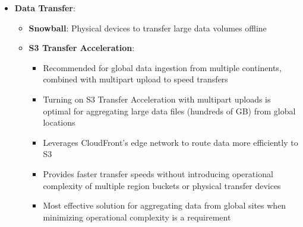\documentclass[11pt,a4paper]{report}
\begin{document}
\begin{itemize}
\begin{itemize}
\begin{itemize}
  \item Perfect for media files that are accessed in unpredictable patterns
  \item Superior to S3 One Zone-IA which doesn't provide multi-AZ resilience required for important media files
\end{itemize}
  \item \textbf{S3 Intelligent-Tiering for Unpredictable Access Patterns}: Automatically moves data between frequent and infrequent access tiers based on observed access patterns without performance impact or operational overhead
  \item \textbf{S3 Intelligent-Tiering with Lifecycle Rules}: When access patterns cannot be predicted or controlled, use S3 Lifecycle rules to transition objects from S3 Standard to S3 Intelligent-Tiering for the most cost-effective storage solution
  \item \textbf{S3 Glacier Instant Retrieval}: For archive data that needs immediate access (retrieval in milliseconds)
  \item \textbf{S3 Glacier Flexible Retrieval}: For rarely accessed long-term data with retrieval times from minutes to hours
  \item \textbf{S3 Glacier Deep Archive}: Lowest-cost storage for long-term archiving with retrieval times within 12 hours
  \item Storage classes have been confirmed to meet diverse performance and cost needs
\end{itemize}
  \item \textbf{Data Transfer}:
\begin{itemize}
  \item \textbf{Snowball}: Physical devices to transfer large data volumes offline
  \item \textbf{S3 Transfer Acceleration}:
\begin{itemize}
  \item Recommended for global data ingestion from multiple continents, combined with multipart upload to speed transfers
  \item Turning on S3 Transfer Acceleration with multipart uploads is optimal for aggregating large data files (hundreds of GB) from global locations
  \item Leverages CloudFront's edge network to route data more efficiently to S3
  \item Provides faster transfer speeds without introducing operational complexity of multiple region buckets or physical transfer devices
  \item Most effective solution for aggregating data from global sites when minimizing operational complexity is a requirement

\end{itemize}
\end{itemize}
\end{itemize}
\end{document}
